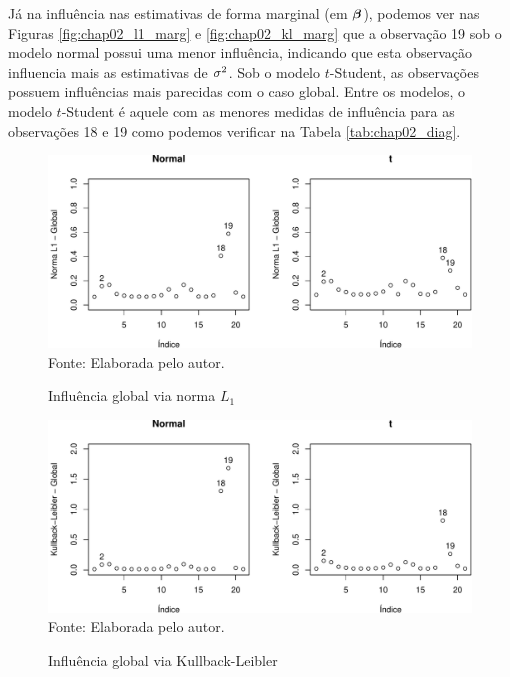 Já na influência nas estimativas de forma marginal (em ${\boldsymbol{\beta}}$), podemos ver nas Figuras \ref{fig:chap02_l1_marg} e \ref{fig:chap02_kl_marg} que a observação 19 sob o modelo normal possui uma menor influência, indicando que esta observação influencia mais as estimativas de $\sigma^2$. Sob o modelo $t$-Student, as observações possuem influências mais parecidas com o caso global. Entre os modelos, o modelo $t$-Student é aquele com as menores medidas de influência para as observações 18 e 19 como podemos verificar na Tabela \ref{tab:chap02_diag}.

\begin{figure}[h]
\begin{center}
\caption{Influência global via norma $L_1$}
\label{fig:chap02_l1_global}
\includegraphics[width=\textwidth]{figuras/chap02_l1_global.pdf}
\\ Fonte: Elaborada pelo autor.
\end{center}
\end{figure}

\begin{figure}[h]
\begin{center}
\caption{Influência global via Kullback-Leibler}
\label{fig:chap02_kl_global}
\includegraphics[width=\textwidth]{figuras/chap02_kl_global.pdf}
\\ Fonte: Elaborada pelo autor.
\end{center}
\end{figure}

